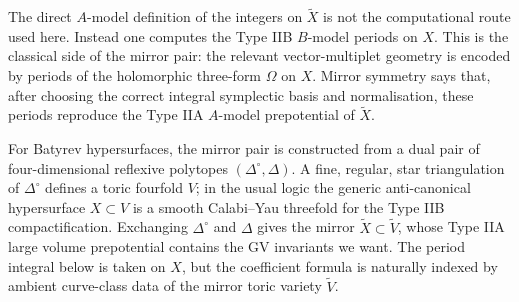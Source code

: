 The direct $A$-model definition of the integers on $\widetilde X$
is not the computational route used here.  Instead one computes the
Type IIB $B$-model periods on $X$.  This is the classical side of
the mirror pair: the relevant vector-multiplet geometry is encoded
by periods of the holomorphic three-form $\Omega$ on $X$.  Mirror
symmetry says that, after choosing the correct integral symplectic
basis and normalisation, these periods reproduce the Type IIA
$A$-model prepotential of $\widetilde X$.

For Batyrev hypersurfaces, the mirror pair is constructed from a
dual pair of four-dimensional reflexive polytopes
$(\Delta^\circ,\Delta)$.  A fine, regular, star triangulation of
$\Delta^\circ$ defines a toric fourfold $V$; in the usual logic \cite{Batyrev:1993oya} the generic anti-canonical hypersurface
$X\subset V$ is a smooth Calabi--Yau threefold for the Type IIB
compactification.  Exchanging $\Delta^\circ$ and $\Delta$ gives the
mirror $\widetilde X\subset\widetilde V$, whose Type IIA
large volume prepotential contains the GV invariants we want.  The
period integral below is taken on $X$, but the coefficient formula is
naturally indexed by ambient curve-class data of the mirror toric
variety $\widetilde V$.  

